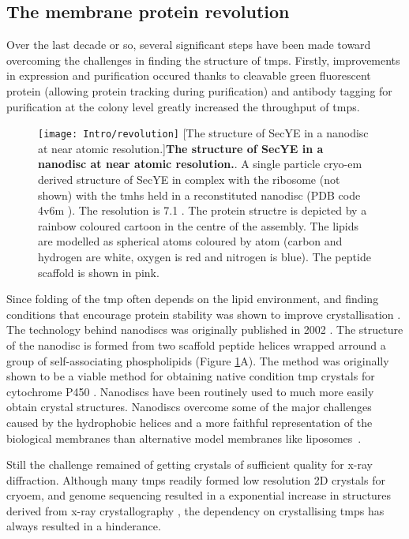 \subsection{The membrane protein revolution}
Over the last decade or so, several significant steps have been made toward overcoming the challenges in finding the structure of \gls{tmp}s.
Firstly, improvements in expression and purification occured thanks to cleavable green fluorescent protein (allowing protein tracking during purification) \cite{Drew2005, Kawate2006} and antibody tagging for purification \cite{Eshagi2005} at the colony level \cite{Cornvik2005} greatly increased the throughput of \gls{tmp}s.

\begin{figure}[ht!]
\centering
\texttt{[image: Intro/revolution]}
		[The structure of SecYE in a nanodisc at near atomic resolution.]{\textbf{The structure of SecYE in a nanodisc at near atomic resolution.}.
		A single particle cryo\--\gls{em} derived structure of SecYE in complex with the ribosome (not shown) with the \gls{tmh}s held in a reconstituted nanodisc (PDB code 4v6m \cite{Frauenfeld2011}).
		The resolution is 7.1 \angstrom.
		The protein structre is depicted by a rainbow coloured cartoon in the centre of the assembly.
		The lipids are modelled as spherical atoms coloured by atom (carbon and hydrogen are white, oxygen is red and nitrogen is blue).
		The peptide scaffold is shown in pink.
		}

\label{fig:revolution}
\end{figure}

Since folding of the \gls{tmp} often depends on the lipid environment, and finding conditions that encourage protein stability was shown to improve crystallisation \cite{Carpenter2007, Rosenbusch2001}.
The technology behind nanodiscs was originally published in 2002 \cite{Bayburt2002}.
The structure of the nanodisc is formed from two scaffold peptide helices wrapped arround a group of self\--associating phospholipids (Figure \ref{fig:revolution}A).
The method was originally shown to be a viable method for obtaining native condition \gls{tmp} crystals for cytochrome P450 \cite{Duan2004}.
Nanodiscs have been routinely used to much more easily obtain crystal structures.
Nanodiscs overcome some of the major challenges caused by the hydrophobic helices and a more faithful representation of the biological membranes than alternative model membranes like liposomes~\cite{Borch2009}.

Still the challenge remained of getting crystals of sufficient quality for x\--ray diffraction.
Although many \gls{tmp}s readily formed low resolution 2D crystals for cryo\gls{em}\cite{Vinothkumar2015, Raunser2009}, and genome sequencing resulted in a exponential increase in structures derived from x\--ray crystallography \cite{Vinothkumar2010}, the dependency on crystallising \gls{tmp}s has always resulted in a hinderance.

